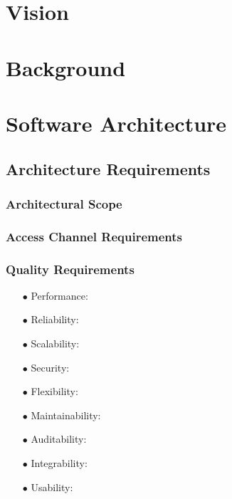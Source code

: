 \documentclass[a4paper,12pt]{article}
\begin{document}
\newpage
\section{Vision}

\newpage
\section{Background}

\newpage
\section{Software Architecture}
\subsection{Architecture Requirements}
\subsubsection{Architectural Scope}

\subsubsection{Access Channel Requirements}

\subsubsection{Quality Requirements}

 \begin{itemize}
 	\item[$\bullet$]Performance: 

 	\item[$\bullet$]Reliability:  

 	\item[$\bullet$]Scalability: 

 	\item[$\bullet$]Security:

 	\item[$\bullet$]Flexibility: 

	 \item[$\bullet$]Maintainability: 

 	\item[$\bullet$]Auditability:

 	\item[$\bullet$]Integrability:
 	\item[$\bullet$]Usability:

 	 \end{itemize}
\end{document}

